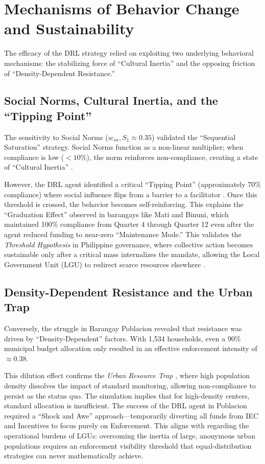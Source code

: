 \section{Mechanisms of Behavior Change and Sustainability}

The efficacy of the DRL strategy relied on exploiting two underlying behavioral mechanisms: the stabilizing force of ``Cultural Inertia'' and the opposing friction of ``Density-Dependent Resistance.''

\subsection{Social Norms, Cultural Inertia, and the ``Tipping Point''}
The sensitivity to Social Norms ($w_{sn}, S_1 \approx 0.35$) validated the ``Sequential Saturation'' strategy. Social Norms function as a non-linear multiplier; when compliance is low ($<10\%$), the norm reinforces non-compliance, creating a state of ``Cultural Inertia'' \citep{Andre2021}. 

However, the DRL agent identified a critical ``Tipping Point'' (approximately 70\% compliance) where social influence flips from a barrier to a facilitator \citep{Centola2018}. Once this threshold is crossed, the behavior becomes self-reinforcing. This explains the ``Graduation Effect'' observed in barangays like Mati and Binuni, which maintained 100\% compliance from Quarter 4 through Quarter 12 even after the agent reduced funding to near-zero ``Maintenance Mode.'' This validates the \textit{Threshold Hypothesis} in Philippine governance, where collective action becomes sustainable only after a critical mass internalizes the mandate, allowing the Local Government Unit (LGU) to redirect scarce resources elsewhere \citep{Nishimura2022}.

\subsection{Density-Dependent Resistance and the Urban Trap}
Conversely, the struggle in Barangay Poblacion revealed that resistance was driven by ``Density-Dependent'' factors. With 1,534 households, even a 90\% municipal budget allocation only resulted in an effective enforcement intensity of $\approx 0.38$. 

This dilution effect confirms the \textit{Urban Resource Trap} \citep{Villanueva2021}, where high population density dissolves the impact of standard monitoring, allowing non-compliance to persist as the status quo. The simulation implies that for high-density centers, standard allocation is insufficient. The success of the DRL agent in Poblacion required a ``Shock and Awe'' approach---temporarily diverting all funds from IEC and Incentives to focus purely on Enforcement. This aligns with \citet{Badua2022} regarding the operational burdens of LGUs: overcoming the inertia of large, anonymous urban populations requires an enforcement visibility threshold that equal-distribution strategies can never mathematically achieve.

